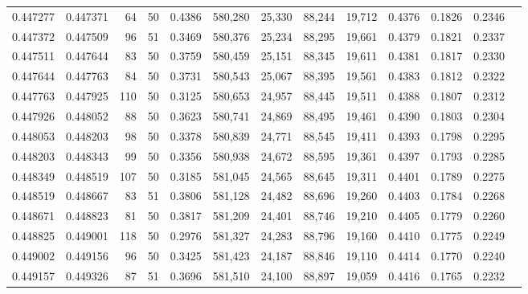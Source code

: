 \begin{tabular}{rrrrrrrrrrrrr}
0.447277 & 0.447371 &    64 &  50 &                                     0.4386 & 580,280 &  25,330 &  88,244 &  19,712 & 0.4376 & 0.1826 & 0.2346 \\
0.447372 & 0.447509 &    96 &  51 &                                     0.3469 & 580,376 &  25,234 &  88,295 &  19,661 & 0.4379 & 0.1821 & 0.2337 \\
0.447511 & 0.447644 &    83 &  50 &                                     0.3759 & 580,459 &  25,151 &  88,345 &  19,611 & 0.4381 & 0.1817 & 0.2330 \\
0.447644 & 0.447763 &    84 &  50 &                                     0.3731 & 580,543 &  25,067 &  88,395 &  19,561 & 0.4383 & 0.1812 & 0.2322 \\
0.447763 & 0.447925 &   110 &  50 &                                     0.3125 & 580,653 &  24,957 &  88,445 &  19,511 & 0.4388 & 0.1807 & 0.2312 \\
0.447926 & 0.448052 &    88 &  50 &                                     0.3623 & 580,741 &  24,869 &  88,495 &  19,461 & 0.4390 & 0.1803 & 0.2304 \\
0.448053 & 0.448203 &    98 &  50 &                                     0.3378 & 580,839 &  24,771 &  88,545 &  19,411 & 0.4393 & 0.1798 & 0.2295 \\
0.448203 & 0.448343 &    99 &  50 &                                     0.3356 & 580,938 &  24,672 &  88,595 &  19,361 & 0.4397 & 0.1793 & 0.2285 \\
0.448349 & 0.448519 &   107 &  50 &                                     0.3185 & 581,045 &  24,565 &  88,645 &  19,311 & 0.4401 & 0.1789 & 0.2275 \\
0.448519 & 0.448667 &    83 &  51 &                                     0.3806 & 581,128 &  24,482 &  88,696 &  19,260 & 0.4403 & 0.1784 & 0.2268 \\
0.448671 & 0.448823 &    81 &  50 &                                     0.3817 & 581,209 &  24,401 &  88,746 &  19,210 & 0.4405 & 0.1779 & 0.2260 \\
0.448825 & 0.449001 &   118 &  50 &                                     0.2976 & 581,327 &  24,283 &  88,796 &  19,160 & 0.4410 & 0.1775 & 0.2249 \\
0.449002 & 0.449156 &    96 &  50 &                                     0.3425 & 581,423 &  24,187 &  88,846 &  19,110 & 0.4414 & 0.1770 & 0.2240 \\
0.449157 & 0.449326 &    87 &  51 &                                     0.3696 & 581,510 &  24,100 &  88,897 &  19,059 & 0.4416 & 0.1765 & 0.2232 \\

\end{tabular}
